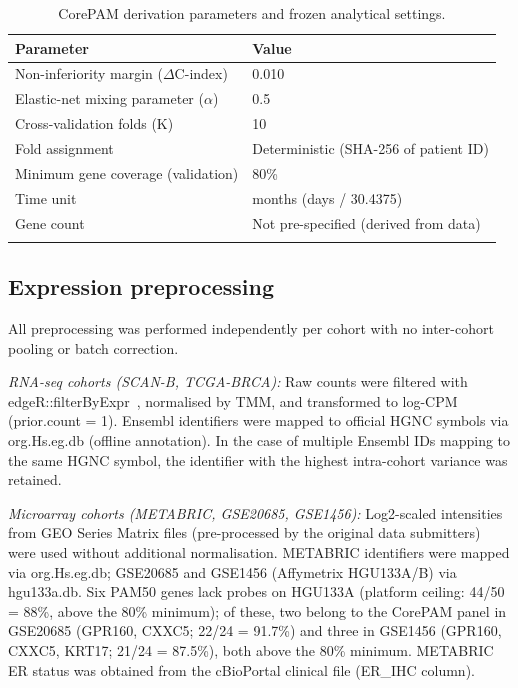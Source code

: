\documentclass[referee,lineno,pdflatex,sn-vancouver-num]{sn-jnl}
\begin{document}
\begin{table}[h]
\caption{CorePAM derivation parameters and frozen analytical settings.}\label{tab:freeze}
\begin{tabular}{@{}ll@{}}
\toprule
Parameter & Value \\
\midrule
Non-inferiority margin ($\Delta$C-index) & 0.010 \\
Elastic-net mixing parameter ($\alpha$) & 0.5 \\
Cross-validation folds (K) & 10 \\
Fold assignment & Deterministic (SHA-256 of patient ID) \\
Minimum gene coverage (validation) & 80\% \\
Time unit & months (days / 30.4375) \\
Gene count & Not pre-specified (derived from data) \\
\botrule
\end{tabular}
\end{table}

\subsection{Expression preprocessing}\label{subsec:expression-preprocessing}

All preprocessing was performed independently per cohort with no inter-cohort pooling or batch correction.

\textit{RNA-seq cohorts (SCAN-B, TCGA-BRCA):} Raw counts were filtered with edgeR::filterByExpr~\cite{robinson2010}, normalised by TMM, and transformed to log-CPM (prior.count = 1). Ensembl identifiers were mapped to official HGNC symbols via org.Hs.eg.db (offline annotation). In the case of multiple Ensembl IDs mapping to the same HGNC symbol, the identifier with the highest intra-cohort variance was retained.

\textit{Microarray cohorts (METABRIC, GSE20685, GSE1456):} Log2-scaled intensities from GEO Series Matrix files (pre-processed by the original data submitters) were used without additional normalisation. METABRIC identifiers were mapped via org.Hs.eg.db; GSE20685 and GSE1456 (Affymetrix HGU133A/B) via hgu133a.db. Six PAM50 genes lack probes on HGU133A (platform ceiling: 44/50 = 88\%, above the 80\% minimum); of these, two belong to the CorePAM panel in GSE20685 (GPR160, CXXC5; 22/24 = 91.7\%) and three in GSE1456 (GPR160, CXXC5, KRT17; 21/24 = 87.5\%), both above the 80\% minimum. METABRIC ER status was obtained from the cBioPortal clinical file (ER\_IHC column).
\end{document}
